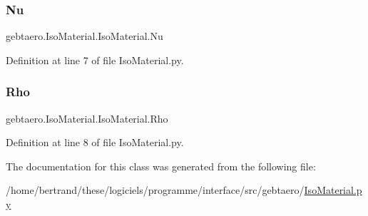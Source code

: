 \subsubsection{\texorpdfstring{Nu}{Nu}}
{\footnotesize\ttfamily gebtaero.\+Iso\+Material.\+Iso\+Material.\+Nu}



Definition at line 7 of file Iso\+Material.\+py.

\mbox{\label{classgebtaero_1_1_iso_material_1_1_iso_material_ace8e4cdd649efe5f36fd0093afa6b93a}} 
\subsubsection{\texorpdfstring{Rho}{Rho}}
{\footnotesize\ttfamily gebtaero.\+Iso\+Material.\+Iso\+Material.\+Rho}



Definition at line 8 of file Iso\+Material.\+py.



The documentation for this class was generated from the following file\+:\begin{DoxyCompactItemize}
\item 
/home/bertrand/these/logiciels/programme/interface/src/gebtaero/\hyperlink{_iso_material_8py}{Iso\+Material.\+py}\end{DoxyCompactItemize}
